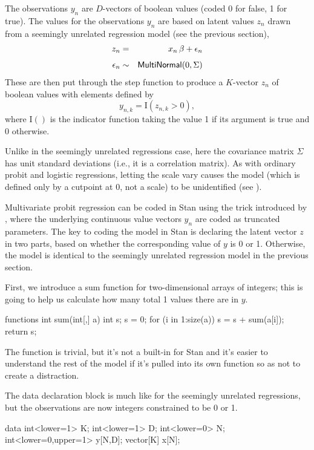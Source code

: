 The observations $y_n$ are $D$-vectors of boolean values (coded 0 for
false, 1 for true).  The values for the observations $y_n$ are based
on latent values $z_n$ drawn from a seemingly unrelated regression
model (see the previous section), 
%
\begin{eqnarray*}
 z_n & = & x_n \, \beta + \epsilon_n
\\[4pt]
 \epsilon_n & \sim & \distro{MultiNormal}(0, \Sigma)
\end{eqnarray*}
%
These are then put through the step function to produce a $K$-vector $z_n$
of boolean values with elements defined by
\[
y_{n, k} = \mathrm{I}(z_{n, k} > 0),
\]
where $\mathrm{I}()$ is the indicator function taking the value 1 if its
argument is true and 0 otherwise.

Unlike in the seemingly unrelated regressions case, here the
covariance matrix $\Sigma$ has unit standard deviations (i.e., it is a
correlation matrix).  As with ordinary probit and logistic
regressions, letting the scale vary causes the model (which is defined
only by a cutpoint at 0, not a scale) to be unidentified (see
\citep{Greene:2011}).

Multivariate probit regression can be coded in Stan using the trick
introduced by \cite{AlbertChib:1993}, where the underlying continuous
value vectors $y_n$ are coded as truncated parameters.  The key to
coding the model in Stan is declaring the latent vector $z$ in two
parts, based on whether the corresponding value of $y$ is 0 or 1.
Otherwise, the model is identical to the seemingly unrelated
regression model in the previous section.

First, we introduce a sum function for two-dimensional arrays of
integers;  this is going to help us calculate how many total 1 values
there are in $y$.
%
\begin{stancode}
functions {
  int sum(int[,] a) {
    int s;
    s = 0;
    for (i in 1:size(a))
      s = s + sum(a[i]);
    return s;
  }
}
\end{stancode}
%
The function is trivial, but it's not a built-in for Stan and it's easier to
understand the rest of the model if it's pulled into its own function
so as not to create a distraction.

The data declaration block is much like for the seemingly unrelated
regressions, but the observations  are now integers
constrained to be 0 or 1.
%
\begin{stancode}
data {
  int<lower=1> K;
  int<lower=1> D;
  int<lower=0> N;
  int<lower=0,upper=1> y[N,D];
  vector[K] x[N];
}
\end{stancode}


